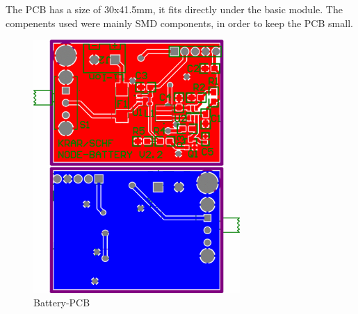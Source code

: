         The PCB has a size of 30x41.5mm, it fits directly under the basic module. 
        The compenents used were mainly SMD components, in order to keep the PCB small. 

        \begin{figure}[H]
            \centering
            \includegraphics[width=0.7\textwidth]{assets/HW/PCB-BATTERY-V2.2.png}
            \caption{Battery-PCB}
        \end{figure}


